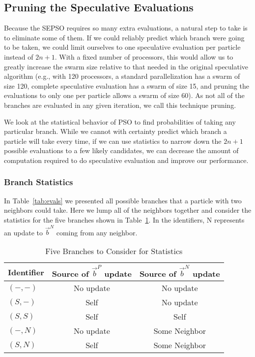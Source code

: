\documentclass[smallcondensed]{svjour3}
\providecommand{\pers}{\ensuremath{P}}
\providecommand{\neigh}{\ensuremath{N}}
\providecommand{\nbest}{\ensuremath{\Vec{b}^\neigh}}
\providecommand{\pbest}{\ensuremath{\Vec{b}^\pers}}
\providecommand{\casexn}{\ensuremath{(S,-)}}
\providecommand{\casexx}{\ensuremath{(S,S)}}
\providecommand{\casepn}{\ensuremath{(-,-)}}
\providecommand{\casepN}{\ensuremath{(-,N)}}
\providecommand{\casexN}{\ensuremath{(S,N)}}
\begin{document}
\subsection{Pruning the Speculative Evaluations}
\label{sec:pruning}

Because the SEPSO requires so many extra evaluations, a natural step to take is
to eliminate some of them.  If we could reliably predict which branch were
going to be taken, we could limit ourselves to one speculative evaluation per
particle instead of $2n+1$.  With a fixed number of processors, this would
allow us to greatly increase the swarm size relative to that needed in the
original speculative algorithm (e.g., with 120 processors, a standard
parallelization has a swarm of size 120, complete speculative evaluation has a
swarm of size 15, and pruning the evaluations to only one per particle allows a
swarm of size 60).  As not all of the branches are evaluated in any given
iteration, we call this technique pruning.

We look at the statistical behavior of PSO to find probabilities of taking any
particular branch.  While we cannot with certainty predict which branch a
particle will take every time, if we can use statistics to narrow down the
$2n+1$ possible evaluations to a few likely candidates, we can decrease the
amount of computation required to do speculative evaluation and improve our
performance.

\subsubsection{Branch Statistics}
\label{sec:statistics}

In Table~\ref{tab:evals} we presented all possible branches that a particle
with two neighbors could take.  Here we lump all of the neighbors together and
consider the statistics for the five branches shown in
Table~\ref{tab:branches}.  In the identifiers, N represents an update to
$\nbest$ coming from any neighbor.

\begin{table}[ht]
  \caption{Five Branches to Consider for Statistics}
  \label{tab:branches}
  \centering
  \begin{tabular}{lcc}
	Identifier&Source of $\pbest$ update&Source of $\nbest$ update\\
	\hline
	\hline
	$\casepn$&No update&No update\\
	\hline
	$\casexn$&Self&No update\\
	\hline
	$\casexx$&Self&Self\\
	\hline
	$\casepN$&No update&Some Neighbor\\
	\hline
	$\casexN$&Self&Some Neighbor\\
	\hline
  \end{tabular}
\end{table}
\end{document}
